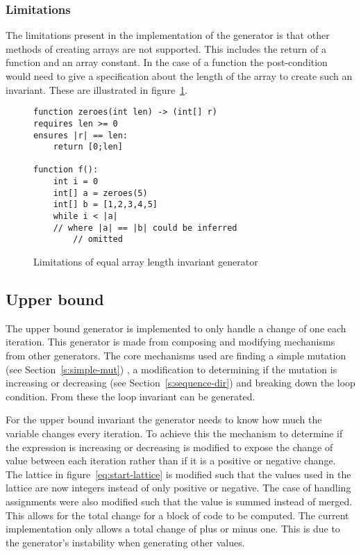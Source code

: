 \subsubsection{Limitations}

The limitations present in the implementation of the generator is
that other methods of creating arrays are not supported.
This includes the return of a function and an array constant.
In the case of a function the post-condition would need to
give a specification about the length of the array to create
such an invariant.
These are illustrated in figure~\ref{lst:whiley-length-limit}.

\begin{figure}
\begin{lstlisting}
function zeroes(int len) -> (int[] r)
requires len >= 0
ensures |r| == len:
    return [0;len]

function f():
    int i = 0
    int[] a = zeroes(5)
    int[] b = [1,2,3,4,5]
    while i < |a|
    // where |a| == |b| could be inferred
        // omitted
\end{lstlisting}
\caption{Limitations of equal array length invariant generator}
\label{lst:whiley-length-limit}
\end{figure}

\subsection{Upper bound}\label{s:upper-bound-impl}

The upper bound generator is implemented to only handle a change of one each iteration.
This generator is made from composing and modifying mechanisms from other generators.
The core mechanisms used are finding a simple mutation (see Section~\ref{s:simple-mut}) ,
a modification to determining if the mutation is increasing or decreasing (see Section~\ref{s:sequence-dir})
and breaking down the loop condition.
From these the loop invariant can be generated.

For the upper bound invariant the generator needs to know how much the variable changes
every iteration. 
To achieve this the mechanism to determine if the expression is increasing or decreasing is
modified to expose the change of value between each iteration rather than if it is a positive or
negative change.
The lattice in figure~\ref{eq:start-lattice} is modified such that the values used in the lattice
are now integers instead of only positive or negative.
The case of handling assignments were also modified such that the value is summed instead of merged.
This allows for the total change for a block of code to be computed.
The current implementation only allows a total change of plus or minus one.
This is due to the generator's instability when generating other values.

